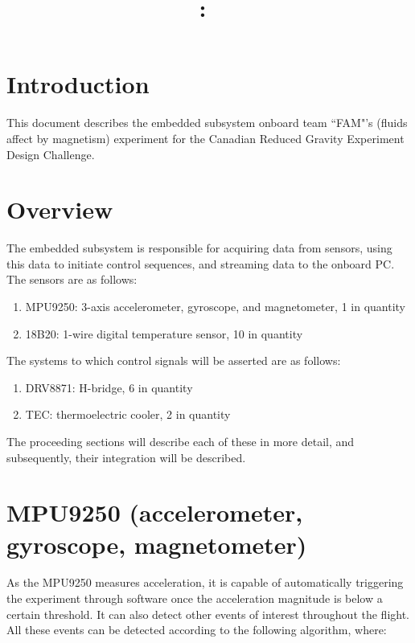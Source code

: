 \documentclass{article}
\title{
	\vspace{2in}
	\textmd{\textbf{\compName:\ \docTitle}}\\
	\vspace{0.1in}
	\vspace{3in}
}
\author{\textbf{\authorName}}
\begin{document}
\maketitle
\clearpage

%
%
%
%

\section*{Introduction} \label{intro}
This document describes the embedded subsystem onboard team ``FAM"'s (fluids affect by magnetism) experiment for the Canadian Reduced Gravity Experiment Design Challenge.

\clearpage

%
%
%
%

\tableofcontents
\clearpage


%
%
%
%

\section{Overview} \label{overview}
The embedded subsystem is responsible for acquiring data from sensors, using this data to initiate control sequences, and streaming data to the onboard PC. The sensors are as follows:

\begin{enumerate}
	\item MPU9250: 3-axis accelerometer, gyroscope, and magnetometer, 1 in quantity
	\item 18B20: 1-wire digital temperature sensor, 10 in quantity
\end{enumerate}

The systems to which control signals will be asserted are as follows:

\begin{enumerate}
	\item DRV8871: H-bridge, 6 in quantity
	\item TEC: thermoelectric cooler, 2 in quantity
\end{enumerate}

The proceeding sections will describe each of these in more detail, and subsequently, their integration will be described.

\clearpage

%
%
%
%

\section{MPU9250 (accelerometer, gyroscope, magnetometer)} \label{MPU}
As the MPU9250 measures acceleration, it is capable of automatically triggering the experiment through software once the acceleration magnitude is below a certain threshold. It can also detect other events of interest throughout the flight. All these events can be detected according to the following algorithm, where:
\end{document}
